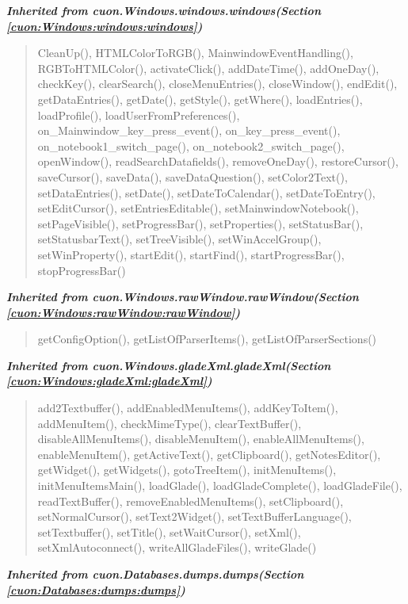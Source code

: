 \large{\textbf{\textit{Inherited from cuon.Windows.windows.windows\textit{(Section \ref{cuon:Windows:windows:windows})}}}}

\begin{quote}
CleanUp(), HTMLColorToRGB(), MainwindowEventHandling(), RGBToHTMLColor(), activateClick(), addDateTime(), addOneDay(), checkKey(), clearSearch(), closeMenuEntries(), closeWindow(), endEdit(), getDataEntries(), getDate(), getStyle(), getWhere(), loadEntries(), loadProfile(), loadUserFromPreferences(), on\_Mainwindow\_key\_press\_event(), on\_key\_press\_event(), on\_notebook1\_switch\_page(), on\_notebook2\_switch\_page(), openWindow(), readSearchDatafields(), removeOneDay(), restoreCursor(), saveCursor(), saveData(), saveDataQuestion(), setColor2Text(), setDataEntries(), setDate(), setDateToCalendar(), setDateToEntry(), setEditCursor(), setEntriesEditable(), setMainwindowNotebook(), setPageVisible(), setProgressBar(), setProperties(), setStatusBar(), setStatusbarText(), setTreeVisible(), setWinAccelGroup(), setWinProperty(), startEdit(), startFind(), startProgressBar(), stopProgressBar()
\end{quote}

\large{\textbf{\textit{Inherited from cuon.Windows.rawWindow.rawWindow\textit{(Section \ref{cuon:Windows:rawWindow:rawWindow})}}}}

\begin{quote}
getConfigOption(), getListOfParserItems(), getListOfParserSections()
\end{quote}

\large{\textbf{\textit{Inherited from cuon.Windows.gladeXml.gladeXml\textit{(Section \ref{cuon:Windows:gladeXml:gladeXml})}}}}

\begin{quote}
add2Textbuffer(), addEnabledMenuItems(), addKeyToItem(), addMenuItem(), checkMimeType(), clearTextBuffer(), disableAllMenuItems(), disableMenuItem(), enableAllMenuItems(), enableMenuItem(), getActiveText(), getClipboard(), getNotesEditor(), getWidget(), getWidgets(), gotoTreeItem(), initMenuItems(), initMenuItemsMain(), loadGlade(), loadGladeComplete(), loadGladeFile(), readTextBuffer(), removeEnabledMenuItems(), setClipboard(), setNormalCursor(), setText2Widget(), setTextBufferLanguage(), setTextbuffer(), setTitle(), setWaitCursor(), setXml(), setXmlAutoconnect(), writeAllGladeFiles(), writeGlade()
\end{quote}

\large{\textbf{\textit{Inherited from cuon.Databases.dumps.dumps\textit{(Section \ref{cuon:Databases:dumps:dumps})}}}}

